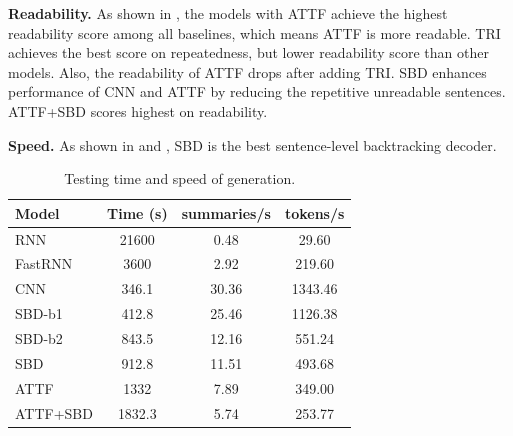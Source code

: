 \textbf{Readability.}
As shown in , 
the models with ATTF achieve the
highest readability score among all baselines, 
which means ATTF is more readable.
TRI achieves the best score on repeatedness, 
but lower readability score than other models.
Also, the readability of ATTF drops after adding TRI.
SBD enhances performance of CNN and ATTF by reducing the repetitive unreadable sentences. 
ATTF+SBD scores highest on readability.


\textbf{Speed.} 
As shown in  and , 
SBD is the best sentence-level backtracking decoder.

\begin{table}[th!]
\centering
\small
\caption{Testing time and speed of generation.}
\begin{tabular}{|l|c|c|c|}
\hline
Model & Time (s) & summaries/s & tokens/s \\
\hline
RNN  &  21600 & 0.48 & 29.60 \\
FastRNN &  3600 & 2.92 & 219.60 \\
\hline
CNN &  346.1 & 30.36 & 1343.46 \\
SBD-b1 &  412.8 & 25.46 & 1126.38 \\
SBD-b2 &  843.5 & 12.16 & 551.24 \\
SBD &  912.8 & 11.51 & 493.68 \\
ATTF & 1332 & 7.89 &  349.00 \\
ATTF+SBD & 1832.3 & 5.74 &  253.77 \\
\hline
\end{tabular}
\label{tab:eval_speed}
\end{table}


